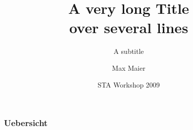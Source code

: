 \documentclass[10pt,a4paper]{beamer}
\title[Short version]{A very long Title \\ over several lines}
\subtitle[short version]{A subtitle}
\date[2009]{STA Workshop 2009}
\author[M. Maier]{Max Maier}
\institute[Uni Leipzig]{Universitaet Leipzig}
\begin{document}
\begin{frame}
  \titlepage
\end{frame}
\begin{frame}
  \frametitle{Uebersicht}
  \tableofcontents
\end{frame}
\end{document}

